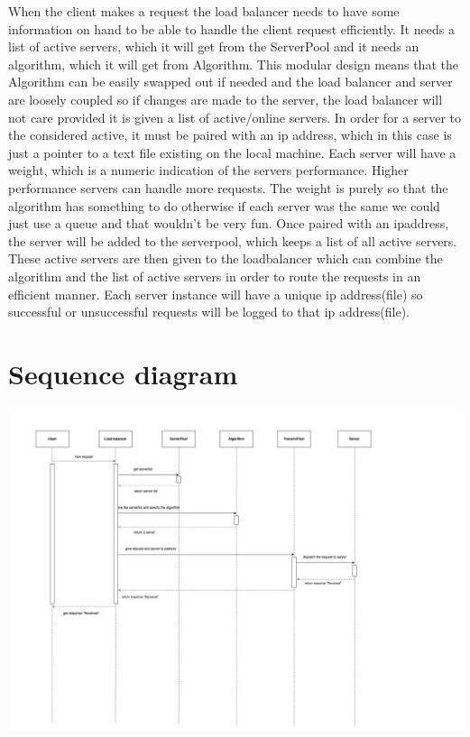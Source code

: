 \documentclass{article}
\begin{document}
When the client makes a request the load balancer needs to have some information on hand to be able to handle the client request efficiently. It needs a list of active servers, which it will get from the ServerPool and it needs an algorithm, which it will get from Algorithm. This modular design means that the Algorithm can be easily swapped out if needed and the load balancer and server are loosely coupled so if changes are made to the server, the load balancer will not care provided it is given a list of active/online servers. In order for a server to the considered active, it must be paired with an ip address, which in this case is just a pointer to a text file existing on the local machine. Each server will have a weight, which is a numeric indication of the servers performance. Higher performance servers can handle more requests. The weight is purely so that the algorithm has something to do otherwise if each server was the same we could just use a queue and that wouldn't be very fun. Once paired with an ipaddress, the server will be added to the serverpool, which keeps a list of all active servers. These active servers are then given to the loadbalancer which can combine the algorithm and the list of active servers in order to route the requests in an efficient manner. Each server instance will have a unique ip address(file) so successful or unsuccessful requests will be logged to that ip address(file). 

\section{Sequence diagram}
\includegraphics[width=1.5\textwidth,center]{System_sequencediagram.jpeg}
\end{document}
